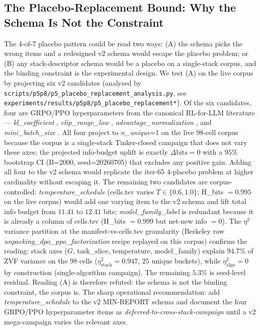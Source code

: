 \subsection{The Placebo-Replacement Bound: Why the Schema Is Not the Constraint}
\label{sec:p5-placebo-bound}
The 4-of-7 placebo pattern could be read two ways: (A) the schema picks
the wrong items and a redesigned v2 schema would escape the placebo
problem; or (B) any stack-descriptor schema would be a placebo on a
single-stack corpus, and the binding constraint is the experimental
design. We test (A) on the live corpus by projecting six v2 candidates
(analysed by
\texttt{scripts/p5p8/p5\_placebo\_replacement\_analysis.py}, see
\texttt{experiments/results/p5p8/p5\_placebo\_replacement\.*}). Of the
six candidates, four are GRPO/PPO hyperparameters from the canonical
RL-for-LLM literature --- \textit{kl\_coefficient}
\citep{schulman2017proximal, lambert2024tulu3}, \textit{clip\_range\_low}
\citep{schulman2017proximal}, \textit{advantage\_normalization}
\citep{shao2024deepseekmath, yu2025dapo}, and
\textit{mini\_batch\_size} \citep{ivison2024unpacking, lambert2024tulu3}.
All four project to \emph{n\_unique}=1 on the live 98-cell corpus
because the corpus is a single-stack Tinker-closed campaign that does
not vary these axes; the projected info-budget uplift is exactly
$\Delta\text{bits} = 0$ with a $95\%$ bootstrap CI (B=2000,
seed=20260705) that excludes any positive gain. Adding all four to the
v2 schema would replicate the iter-65 4-placebo problem at higher
cardinality without escaping it. The remaining two candidates are
corpus-controlled: \textit{temperature\_schedule} (cells.tsv varies
$T \in \{0.6, 1.0\}$; H\_bits $= 0.995$ on the live corpus) would add
one varying item to the v2 schema and lift total info budget from
$11.41$ to $12.41$ bits; \textit{model\_family\_label} is redundant
because it is already a column of cells.tsv (H\_bits $= 0.999$ but
net-new info $= 0$). The $\eta^2$ variance partition at the
manifest-vs-cells.tsv granularity (Berkeley row
\textit{unpacking\_dpo\_ppo\_factorization} recipe replayed on this
corpus) confirms the reading: stack axes ($G$, task\_slice,
temperature, model\_family) explain $94.7\%$ of ZVF variance on the
$98$ cells ($\eta^2_{\text{stack}} = 0.947$, $25$ unique buckets),
while $\eta^2_{\text{algo}} = 0$ by construction (single-algorithm
campaign). The remaining $5.3\%$ is seed-level residual. Reading (A)
is therefore refuted: the schema is not the binding constraint, the
corpus is. The sharp operational recommendation: add
\textit{temperature\_schedule} to the v2 MIN-REPORT schema and
document the four GRPO/PPO hyperparameter items as
\textit{deferred-to-cross-stack-campaign} until a v2 mega-campaign
varies the relevant axes.
